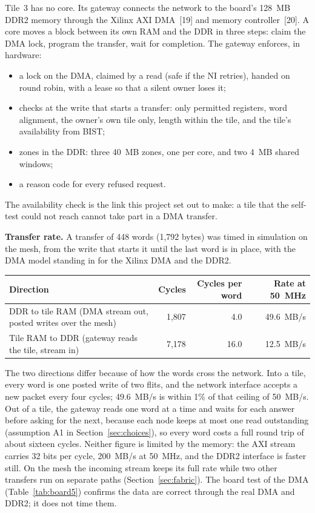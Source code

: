 \documentclass[11pt,a4paper]{article}
\begin{document}
Tile~3 has no core. Its gateway connects the network to the board's 128~MB
DDR2 memory through the Xilinx AXI DMA~[19] and memory controller~[20]. A core
moves a block between its own RAM and the DDR in three steps: claim the DMA
lock, program the transfer, wait for completion. The gateway enforces, in
hardware:
\begin{itemize}
\item a lock on the DMA, claimed by a read (safe if the NI retries), handed on
round robin, with a lease so that a silent owner loses it;
\item checks at the write that starts a transfer: only permitted registers,
word alignment, the owner's own tile only, length within the tile, and the
tile's availability from BIST;
\item zones in the DDR: three 40~MB zones, one per core, and two 4~MB shared
windows;
\item a reason code for every refused request.
\end{itemize}

The availability check is the link this project set out to make: a tile that
the self-test could not reach cannot take part in a DMA transfer.

\textbf{Transfer rate.} A transfer of 448 words (1,792 bytes) was timed in
simulation on the mesh, from the write that starts it until the last word is
in place, with the DMA model standing in for the Xilinx DMA and the DDR2.

\begin{tabularx}{\textwidth}{@{}Yrrr@{}}
\toprule
\textbf{Direction} & \textbf{Cycles} & \textbf{Cycles per word} &
\textbf{Rate at 50~MHz} \\
\midrule
DDR to tile RAM (DMA stream out, posted writes over the mesh) & 1,807 & 4.0 &
49.6~MB/s \\
Tile RAM to DDR (gateway reads the tile, stream in) & 7,178 & 16.0 &
12.5~MB/s \\
\bottomrule
\end{tabularx}

The two directions differ because of how the words cross the network. Into a
tile, every word is one posted write of two flits, and the network interface
accepts a new packet every four cycles; 49.6~MB/s is within 1\% of that
ceiling of 50~MB/s. Out of a tile, the gateway reads one word at a time and
waits for each answer before asking for the next, because each node keeps at
most one read outstanding (assumption A1 in Section~\ref{sec:choices}), so every word costs a
full round trip of about sixteen cycles. Neither figure is limited by the
memory: the AXI stream carries 32 bits per cycle, 200~MB/s at 50~MHz, and the
DDR2 interface is faster still. On the mesh the incoming stream keeps its
full rate while two other transfers run on separate paths
(Section~\ref{sec:fabric}). The board test of the DMA (Table~\ref{tab:board5}) confirms
the data are correct through the real DMA and DDR2; it does not time them.
\end{document}
